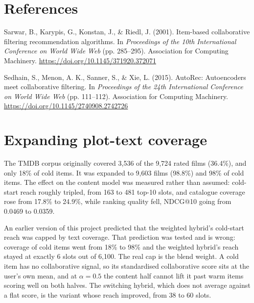 \documentclass[10pt,twocolumn,letterpaper]{article}
\newenvironment{apareferences}%
  {\section*{References}\small
   \setlength{\parindent}{-0.22in}\setlength{\leftskip}{0.22in}%
   \setlength{\parskip}{5pt}}%
  {\par}
\begin{document}
\begin{apareferences}
Sarwar, B., Karypis, G., Konstan, J., \& Riedl, J. (2001). Item-based
collaborative filtering recommendation algorithms. In \textit{Proceedings of
the 10th International Conference on World Wide Web} (pp. 285--295).
Association for Computing Machinery.
\url{https://doi.org/10.1145/371920.372071}

Sedhain, S., Menon, A. K., Sanner, S., \& Xie, L. (2015). AutoRec:
Autoencoders meet collaborative filtering. In \textit{Proceedings of the 24th
International Conference on World Wide Web} (pp. 111--112). Association for
Computing Machinery. \url{https://doi.org/10.1145/2740908.2742726}

\end{apareferences}

\appendix
\section{Expanding plot-text coverage}\label{app:tmdb}
The TMDB corpus originally covered 3,536 of the 9,724 rated films (36.4\%),
and only 18\% of cold items. It was expanded to 9,603 films (98.8\%) and 98\%
of cold items. The effect on the content model was measured rather than
assumed: cold-start reach roughly tripled, from 163 to 481 top-10 slots, and
catalogue coverage rose from 17.8\% to 24.9\%, while ranking quality fell,
NDCG@10 going from 0.0469 to 0.0359.

An earlier version of this project predicted that the weighted hybrid's
cold-start reach was capped by text coverage. That prediction was tested and
is wrong: coverage of cold items went from 18\% to 98\% and the weighted
hybrid's reach stayed at exactly 6 slots out of 6,100. The real cap is the
blend weight. A cold item has no collaborative signal, so its standardised
collaborative score sits at the user's own mean, and at $\alpha = 0.5$ the
content half cannot lift it past warm items scoring well on both halves. The
switching hybrid, which does not average against a flat score, is the variant
whose reach improved, from 38 to 60 slots.
\end{document}
